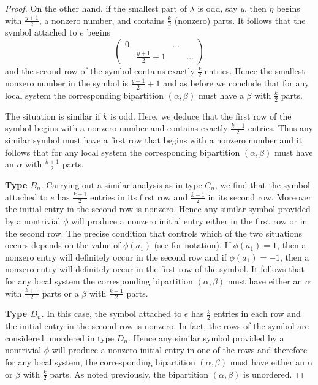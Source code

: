 \documentclass[10pt]{amsart}
\theoremstyle{plain}
\theoremstyle{definition}
\theoremstyle{remark}
\begin{document}
\begin{proof}
On the other hand, if the smallest part of $\lambda$ is odd, say $y$, then $\eta$ begins with 
$\frac{y+1}{2}$, a nonzero number, and contains $\frac{k}{2}$ (nonzero) parts.
It follows that the symbol attached to $e$ begins 
$$\begin{pmatrix}
     0  && \dots \\
       & \frac{y+1}{2} + 1&& \dots 
     \end{pmatrix}$$
and the second row of the symbol contains exactly $\frac{k}{2}$ entries.
Hence the smallest nonzero number in the symbol is $\frac{y+1}{2} + 1$ and as before 
we conclude that for any local system the corresponding bipartition $(\alpha, \beta)$ must have a $\beta$ with $\frac{k}{2}$ parts.

The situation is similar if $k$ is odd.   
Here, we deduce that the first row of the symbol begins with a nonzero number and contains exactly $\frac{k+1}{2}$ entries.
Thus any similar symbol must have a first row that begins with a nonzero number and  it follows that 
for any local system the corresponding bipartition $(\alpha, \beta)$ must have an $\alpha$ with $\frac{k+1}{2}$ parts.

\medskip

\textbf{Type $B_n$}.    Carrying out a similar analysis as in type $C_n$, we find that the symbol attached to $e$ has
$\frac{k+1}{2}$ entries in its first row and $\frac{k-1}{2}$ in its second row.  Moreover the initial entry in the second row is nonzero.
Hence any similar symbol provided by a nontrivial $\phi$ will produce a nonzero initial entry either in the first row or in the second row.
The precise condition that controls which of the two situations occurs depends on the value of $\phi(a_1)$ (see  \cite[Chapter 13.3]{carter:book} for notation).
If $\phi(a_1)=1$, then a nonzero entry will definitely occur in the second row
and if $\phi(a_1)=-1$, then a nonzero entry will definitely occur in the first row of the symbol.
It follows that for any local system the corresponding bipartition $(\alpha, \beta)$ must have either an $\alpha$ with $\frac{k+1}{2}$  parts or
a $\beta$ with $\frac{k-1}{2}$  parts.

\medskip

 \textbf{Type $D_n$}.   In this case, the symbol attached to $e$ has
$\frac{k}{2}$ entries in each row and the initial entry in the second row is nonzero.  In fact, 
the rows of the symbol are considered unordered in type $D_n$.
Hence any similar symbol provided by a nontrivial $\phi$ will produce a nonzero initial entry in one of the rows
and therefore for any local system, the corresponding bipartition $(\alpha, \beta)$ must have either an $\alpha$ or $\beta$ with $\frac{k}{2}$ parts.   As noted previously, the bipartition $(\alpha, \beta)$ is unordered.
\end{proof}
\end{document}
